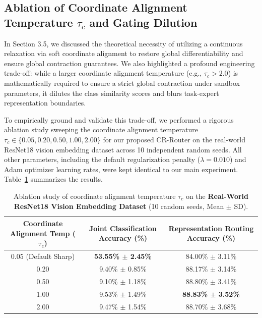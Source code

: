 \documentclass{article}
\theoremstyle{plain}
\theoremstyle{definition}
\theoremstyle{remark}
\begin{document}
\subsection{Ablation of Coordinate Alignment Temperature $\tau_c$ and Gating Dilution}
In Section 3.5, we discussed the theoretical necessity of utilizing a continuous relaxation via soft coordinate alignment to restore global differentiability and ensure global contraction guarantees. We also highlighted a profound engineering trade-off: while a larger coordinate alignment temperature (e.g., $\tau_c > 2.0$) is mathematically required to ensure a strict global contraction under sandbox parameters, it dilutes the class similarity scores and blurs task-expert representation boundaries.

To empirically ground and validate this trade-off, we performed a rigorous ablation study sweeping the coordinate alignment temperature $\tau_c \in \{0.05, 0.20, 0.50, 1.00, 2.00\}$ for our proposed CR-Router on the real-world ResNet18 vision embedding dataset across 10 independent random seeds. All other parameters, including the default regularization penalty ($\lambda = 0.010$) and Adam optimizer learning rates, were kept identical to our main experiment. Table~\ref{tab:tau_c_ablation} summarizes the results.

\begin{table}[t]
\centering
\caption{Ablation study of coordinate alignment temperature $\tau_c$ on the \textbf{Real-World ResNet18 Vision Embedding Dataset} (10 random seeds, Mean $\pm$ SD).}
\vskip 0.15in
\label{tab:tau_c_ablation}
\begin{tabular}{ccc}
\toprule
\textbf{Coordinate Alignment Temp ($\tau_c$)} & \textbf{Joint Classification Accuracy (\%)} & \textbf{Representation Routing Accuracy (\%)} \\
\midrule
0.05 (Default Sharp) & \textbf{53.55\% $\pm$ 2.45\%} & 84.00\% $\pm$ 3.11\% \\
0.20 & 9.40\% $\pm$ 0.85\% & 88.17\% $\pm$ 3.14\% \\
0.50 & 9.10\% $\pm$ 1.18\% & 88.80\% $\pm$ 3.41\% \\
1.00 & 9.53\% $\pm$ 1.49\% & \textbf{88.83\% $\pm$ 3.52\%} \\
2.00 & 9.47\% $\pm$ 1.54\% & 88.70\% $\pm$ 3.68\% \\
\bottomrule
\end{tabular}
\end{table}
\end{document}
